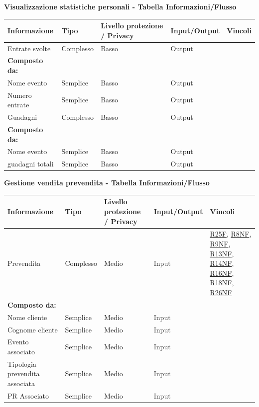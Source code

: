 \documentclass[a4paper]{article}
\begin{document}
\textbf{Visualizzazione statistiche personali  - Tabella Informazioni/Flusso}

\begin{center}
    \begin{tabularx}{1\textwidth}{|X|X|X|X|X|}
        \hline
        \textbf{Informazione} &\textbf{Tipo} & \textbf{Livello protezione / Privacy} & \textbf{Input/Output} & \textbf{Vincoli}\\
        \hline
        \hline
        Entrate svolte & Complesso & Basso & Output & \\
        \textbf{Composto da:} & & & & \\
        Nome evento & Semplice & Basso & Output & \\
        Numero entrate & Semplice & Basso & Output & \\
        \hline
        Guadagni & Complesso & Basso & Output & \\
        \textbf{Composto da:} & & & & \\
        Nome evento & Semplice & Basso & Output & \\
        guadagni totali & Semplice & Basso & Output & \\
        \hline
    \end{tabularx}
\end{center}

\textbf{Gestione vendita prevendita  - Tabella Informazioni/Flusso}

\begin{center}
    \begin{tabularx}{1\textwidth}{|X|X|X|X|X|}
        \hline
        \textbf{Informazione} &\textbf{Tipo} & \textbf{Livello protezione / Privacy} & \textbf{Input/Output} & \textbf{Vincoli}\\
        \hline
        \hline
        Prevendita & Complesso & Medio & Input & \hyperlink{R25F}{R25F}, \hyperlink{R8NF}{R8NF}, \hyperlink{R9NF}{R9NF}, \hyperlink{R13NF}{R13NF}, \hyperlink{R14NF}{R14NF}, \hyperlink{R16NF}{R16NF}, \hyperlink{R18NF}{R18NF}, \hyperlink{R26NF}{R26NF} \\
        \textbf{Composto da:} & & & & \\
        Nome cliente & Semplice & Medio & Input & \\
        Cognome cliente & Semplice & Medio & Input & \\
        Evento associato & Semplice & Medio & Input & \\
        Tipologia prevendita associata & Semplice & Medio & Input & \\
        PR Associato & Semplice & Medio & Input & \\
        \hline
    \end{tabularx}
\end{center}
\end{document}
